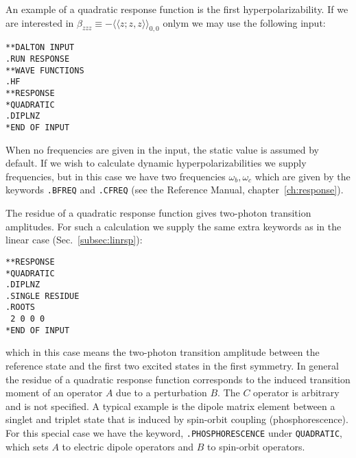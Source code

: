 \begin{center}
\end{center}

An example of a quadratic response function
is the first 
hyperpolarizability. If we are
interested in
$\beta_{zzz}\equiv-\langle\!\langle z;z,z\rangle\!\rangle_{0,0}$ 
onlym we may use the following input:
\begin{verbatim}
**DALTON INPUT
.RUN RESPONSE
**WAVE FUNCTIONS
.HF
**RESPONSE
*QUADRATIC
.DIPLNZ
*END OF INPUT
\end{verbatim}
When no frequencies are given in the input, the static value is assumed by
default. If we wish to calculate dynamic hyperpolarizabilities we supply
frequencies, but in this case we have two frequencies
$\omega_b, \omega_c$ which are given by the keywords \texttt{.BFREQ} and
{\tt .CFREQ} (see the Reference Manual, chapter~\ref{ch:response}).

The residue of a quadratic response function gives two-photon
transition amplitudes. For such a
calculation we supply the same extra 
keywords as in the linear case (Sec.~\ref{subsec:linrsp}):
\begin{verbatim}
**RESPONSE
*QUADRATIC
.DIPLNZ
.SINGLE RESIDUE
.ROOTS
 2 0 0 0
*END OF INPUT
\end{verbatim}
which in this case means the two-photon transition
amplitude between the
reference state and the first two excited states in the first symmetry.  In
general the residue of a quadratic response function corresponds to the
induced transition moment of an operator $A$ due to a perturbation $B$.
The $C$ operator is arbitrary and is not specified.  A typical example is
the dipole matrix element between a singlet and triplet state that is
induced by spin-orbit coupling
(phosphorescence). For this special case we 
have the keyword, {\tt .PHOSPHORESCENCE} under {\tt *QUADRATIC}, which sets
$A$ to electric dipole operators and $B$ to spin-orbit operators.

